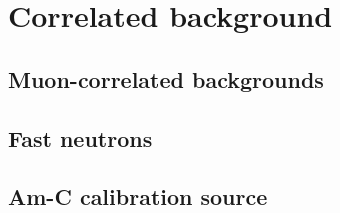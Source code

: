 \begin{figure}
    \caption{}
    \label{fig:ncorr}
\end{figure}


\section{Correlated background}

\subsection{Muon-correlated backgrounds}
\label{subsec:li9}

\subsection{Fast neutrons}
\label{subsec:fastn}

\subsection{Am-C calibration source}
